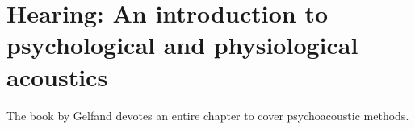 \section{Hearing: An introduction to psychological and physiological acoustics}

The book by Gelfand \cite{gelfand2009hearing} devotes an entire chapter to cover
psychoacoustic methods.
